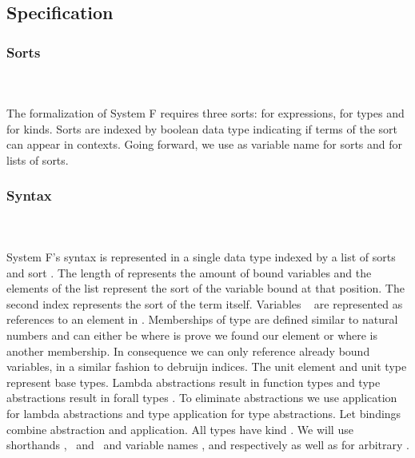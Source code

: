 \subsection{Specification}
\subsubsection{Sorts}\hfill\\\\
The formalization of System F requires three sorts:  for expressions,  for types and  for kinds. 
\FSort
Sorts are indexed by boolean data type  indicating if terms of the sort can appear in contexts.
Going forward, we use  as variable name for sorts and  for lists of sorts.

\subsubsection{Syntax}\hfill\\\\
System F's syntax is represented in a single data type  indexed by a list of sorts  and sort . 
The length of  represents the amount of bound variables and the elements  of the list represent the sort of the variable bound at that position. 
The second index  represents the sort of the term itself.
\FTerm
Variables \  are represented as references    to an element in .
Memberships of type    are defined similar to natural numbers and can either be  where  is prove we found our element or   where  is another membership. 
In consequence we can only reference already bound variables, in a similar fashion to debruijn indices. 
The unit element  and unit type  represent base types. Lambda abstractions   result in function types    and type abstractions   result in forall types  . 
To eliminate abstractions we use application    for lambda abstractions and type application    for type abstractions. 
Let bindings     combine abstraction and application. All types  have kind .
We will use shorthands \FVar, \FExpr\ and \FType\ and variable names ,  and  respectively as well as  for arbitrary   .

